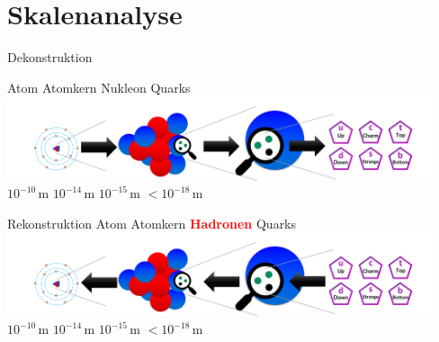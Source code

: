 \section{Skalenanalyse}
\begin{frame}{Dekonstruktion}

    \hspace{1.1cm} Atom \hspace{1cm} Atomkern \hspace{1.5cm} Nukleon \hspace{1cm} Quarks\\\vspace{1cm}
     \includegraphics[width=12.5cm]{Figures Lecture on Hadrons/Scale Atom_Quark_updown-approach.png}\\\vspace{1cm}
   \hspace{1.1cm} $10^{-10}$\,m \hspace{1.2cm}  $10^{-14}$\,m  \hspace{1.5cm}  $10^{-15}$\,m  \hspace{1.3cm}  $<10^{-18}$\,m

\end{frame}
\begin{frame}{Rekonstruktion}
     \hspace{1.1cm} Atom \hspace{1cm} Atomkern \hspace{1.5cm} \textbf{\textcolor{red}{Hadronen}} \hspace{1cm} Quarks\\\vspace{1cm}
     \includegraphics[width=12.5cm]{Figures Lecture on Hadrons/Scale Atom_Quark_downup-approach.png}\\\vspace{1cm}
   \hspace{1.1cm} $10^{-10}$\,m \hspace{1.2cm}  $10^{-14}$\,m  \hspace{1.5cm}  $10^{-15}$\,m  \hspace{1.3cm}  $<10^{-18}$\,m
\end{frame}
